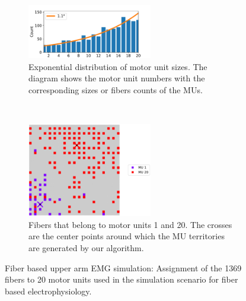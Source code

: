 \begin{figure}[H]
  \centering%
  \begin{subfigure}[t]{\textwidth}%
    \centering%
    \includegraphics[width=0.6\textwidth]{images/results/application/MU_fibre_distribution_37x37_20c_txt_fiber_distribution_.pdf}%
    \caption{Exponential distribution of motor unit sizes. The diagram shows the motor unit numbers with the corresponding sizes or fibers counts of the MUs.}%
    \label{fig:MU_fibre_distribution_37x37_20c_txt_fiber_distribution}%
  \end{subfigure}\\
  \begin{subfigure}[t]{\textwidth}%
    \centering%
    \includegraphics[width=0.6\textwidth]{images/results/application/MU_fibre_distribution_37x37_20c_txt_2d_fiber_distribution_.pdf}%
    \caption{Fibers that belong to motor units 1 and 20. The crosses are the center points around which the MU territories are generated by our algorithm.}%
    \label{fig:MU_fibre_distribution_37x37_20c_txt_2d_fiber_distribution}%
  \end{subfigure}
  \caption{Fiber based upper arm EMG simulation: Assignment of the 1369 fibers to 20 motor units used in the simulation scenario for fiber based electrophysiology.}%
  \label{fig:MU_fibre_distribution_37x37_20c}%
\end{figure}%

